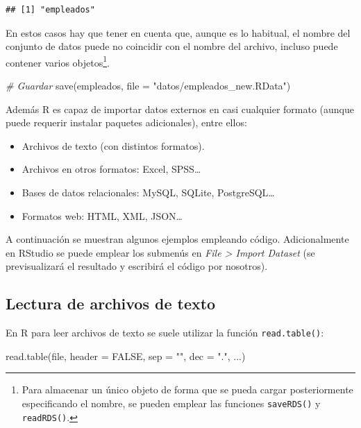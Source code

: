 \documentclass[
]{book}
\newenvironment{Shaded}{\begin{snugshade}}{\end{snugshade}}
\newcommand{\AttributeTok}[1]{\textcolor[rgb]{0.77,0.63,0.00}{#1}}
\newcommand{\CommentTok}[1]{\textcolor[rgb]{0.56,0.35,0.01}{\textit{#1}}}
\newcommand{\ConstantTok}[1]{\textcolor[rgb]{0.00,0.00,0.00}{#1}}
\newcommand{\FunctionTok}[1]{\textcolor[rgb]{0.00,0.00,0.00}{#1}}
\newcommand{\NormalTok}[1]{#1}
\newcommand{\StringTok}[1]{\textcolor[rgb]{0.31,0.60,0.02}{#1}}
\theoremstyle{break}
\theoremstyle{nonumberplain}
\begin{document}
\begin{verbatim}
## [1] "empleados"
\end{verbatim}

En estos casos hay que tener en cuenta que, aunque es lo habitual, el nombre del conjunto de datos puede no coincidir con el nombre del archivo, incluso puede contener varios objetos\footnote{Para almacenar un único objeto de forma que se pueda cargar posteriormente especificando el nombre, se pueden emplear las funciones \texttt{saveRDS()} y \texttt{readRDS()}.}.

\begin{Shaded}
\begin{Highlighting}[]
\CommentTok{\# Guardar}
\FunctionTok{save}\NormalTok{(empleados, }\AttributeTok{file =} \StringTok{"datos/empleados\_new.RData"}\NormalTok{)}
\end{Highlighting}
\end{Shaded}

Además R es capaz de importar datos externos en casi cualquier formato (aunque puede requerir instalar paquetes adicionales), entre ellos:

\begin{itemize}
\item
  Archivos de texto (con distintos formatos).
\item
  Archivos en otros formatos: Excel, SPSS\ldots{}
\item
  Bases de datos relacionales: MySQL, SQLite, PostgreSQL\ldots{}
\item
  Formatos web: HTML, XML, JSON\ldots{}
\end{itemize}

A continuación se muestran algunos ejemplos empleando código.
Adicionalmente en RStudio se puede emplear los submenús en \emph{File \textgreater{} Import Dataset} (se previsualizará el resultado y escribirá el código por nosotros).

\hypertarget{archivos-texto}{%
\subsection{Lectura de archivos de texto}\label{archivos-texto}}

En R para leer archivos de texto se suele utilizar la función \texttt{read.table()}:

\begin{Shaded}
\begin{Highlighting}[]
\FunctionTok{read.table}\NormalTok{(file, }\AttributeTok{header =} \ConstantTok{FALSE}\NormalTok{, }\AttributeTok{sep =} \StringTok{""}\NormalTok{, }\AttributeTok{dec =} \StringTok{"."}\NormalTok{, ...)  }
\end{Highlighting}
\end{Shaded}
\end{document}

